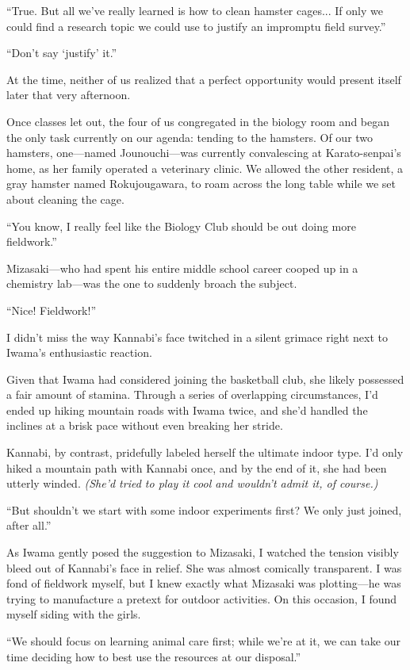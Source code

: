\documentclass[
    a4paper,
    12pt,
    twoside,
    openany,
    UTF8,
    fontset=windows
]{ctexbook}
\begin{document}
``True. But all we've really learned is how to clean hamster cages... If only we could find a research topic we could use to justify an impromptu field survey.''

``Don't say `justify' it.''

At the time, neither of us realized that a perfect opportunity would present itself later that very afternoon.

Once classes let out, the four of us congregated in the biology room and began the only task currently on our agenda: tending to the hamsters. Of our two hamsters, one---named Jounouchi---was currently convalescing at Karato-senpai's home, as her family operated a veterinary clinic. We allowed the other resident, a gray hamster named Rokujougawara, to roam across the long table while we set about cleaning the cage.

``You know, I really feel like the Biology Club should be out doing more fieldwork.''

Mizasaki---who had spent his entire middle school career cooped up in a chemistry lab---was the one to suddenly broach the subject.

``Nice! Fieldwork!''

I didn't miss the way Kannabi's face twitched in a silent grimace right next to Iwama's enthusiastic reaction.

Given that Iwama had considered joining the basketball club, she likely possessed a fair amount of stamina. Through a series of overlapping circumstances, I'd ended up hiking mountain roads with Iwama twice, and she'd handled the inclines at a brisk pace without even breaking her stride.

Kannabi, by contrast, pridefully labeled herself the ultimate indoor type. I'd only hiked a mountain path with Kannabi once, and by the end of it, she had been utterly winded. \textit{(She'd tried to play it cool and wouldn't admit it, of course.)}

``But shouldn't we start with some indoor experiments first? We only just joined, after all.''

As Iwama gently posed the suggestion to Mizasaki, I watched the tension visibly bleed out of Kannabi's face in relief. She was almost comically transparent. I was fond of fieldwork myself, but I knew exactly what Mizasaki was plotting---he was trying to manufacture a pretext for outdoor activities. On this occasion, I found myself siding with the girls.

``We should focus on learning animal care first; while we're at it, we can take our time deciding how to best use the resources at our disposal.''
\end{document}
